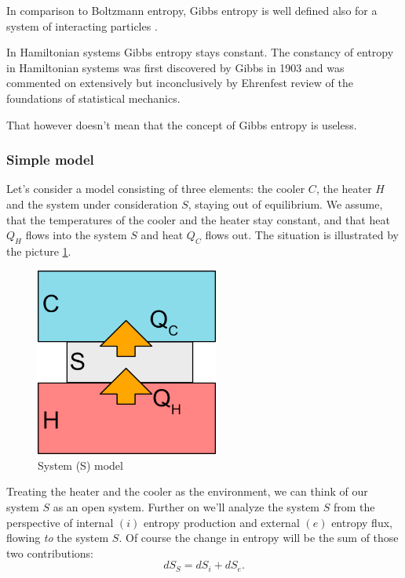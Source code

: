 \documentclass[a4paper,12pt]{article}
\begin{document}
In comparison to Boltzmann entropy, Gibbs entropy is well defined also for a system of interacting particles \cite{Jaynes:1965gg}.


In Hamiltonian systems Gibbs entropy stays constant.
The constancy of entropy in Hamiltonian systems was first discovered by Gibbs in 1903 and was commented on extensively but inconclusively by Ehrenfest review of the foundations of statistical mechanics.

That however doesn't mean that the concept of Gibbs entropy 
is useless.


\subsubsection{Simple model}
Let's consider a model consisting of three elements: the cooler $C$, the heater $H$ and the system under consideration $S$, staying out of equilibrium.
We assume, that the temperatures of the cooler and the heater stay constant, and that heat $Q_H$ flows into the system $S$ and heat $Q_C$ flows out. The situation is illustrated by the picture \ref{Fig2}.
\begin{figure}[ht!]
\centering \includegraphics[width=6cm]{system} \caption{System (S) model}
\label{Fig2} 
\end{figure}

Treating the heater and the cooler as the environment, we can think of our system $S$ as an open system.
Further on we'll analyze the system $S$ from the perspective of internal $(i)$ entropy production
and external $(e)$ entropy flux, flowing \emph{to} the system $S$. 
Of course the change in entropy will be the sum of those two contributions:
\begin{equation}
dS_S=dS_i+dS_e.
\label{entrosum}
\end{equation}
\end{document}
